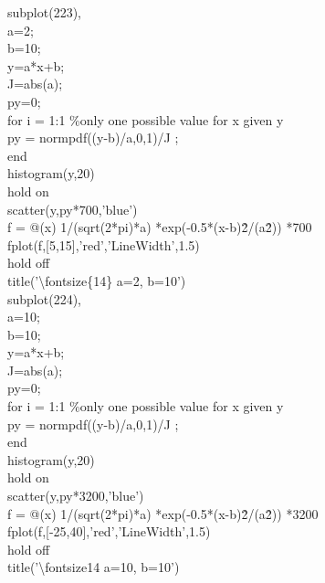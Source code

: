 \documentclass[twoside,twocolumn]{article}
\begin{document}
\begin{itshape}
subplot(223),\\
a=2;\\
b=10;\\
y=a*x+b;\\
J=abs(a);\\
py=0;\\
for i = 1:1 \%only one possible value for x given y\\
    py = normpdf((y-b)/a,0,1)/J ;\\
end\\
histogram(y,20)\\
hold on\\
scatter(y,py*700,'blue')\\
f = @(x) 1/(sqrt(2*pi)*a) *exp(-0.5*(x-b)\^2/(a\^2)) *700\\
fplot(f,[5,15],'red','LineWidth',1.5)\\
hold off\\
title('\textbackslash fontsize\{14\} a=2, b=10')\\

subplot(224),\\
a=10;\\
b=10;\\
y=a*x+b;\\
J=abs(a);\\
py=0;\\
for i = 1:1 \%only one possible value for x given y\\
    py = normpdf((y-b)/a,0,1)/J ;\\
end\\
histogram(y,20)\\
hold on\\
scatter(y,py*3200,'blue')\\
f = @(x) 1/(sqrt(2*pi)*a) *exp(-0.5*(x-b)\^2/(a\^2)) *3200\\
fplot(f,[-25,40],'red','LineWidth',1.5)\\
hold off\\
title('\textbackslash fontsize{14} a=10, b=10')\\

\end{itshape}
\end{document}
